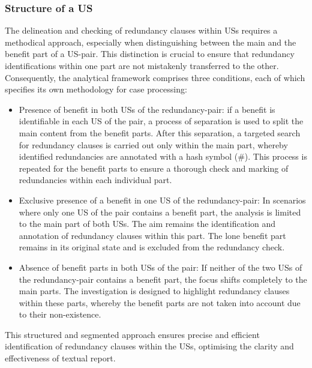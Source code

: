 \subsubsection*{Structure of a US}
The delineation and checking of redundancy clauses within USs requires a methodical approach, especially when distinguishing between the main and the benefit part of a US-pair. This distinction is crucial to ensure that redundancy identifications within one part are not mistakenly transferred to the other. Consequently, the analytical framework comprises three conditions, each of which specifies its own methodology for case processing:
\begin{itemize}
	\item Presence of benefit in both USs of the redundancy-pair: if a benefit is identifiable in each US of the pair, a process of separation is used to split the main content from the benefit parts. After this separation, a targeted search for redundancy clauses is carried out only within the main part, whereby identified redundancies are annotated with a hash symbol (\#). This process is repeated for the benefit parts to ensure a thorough check and marking of redundancies within each individual part.
	
	\item Exclusive presence of a benefit in one US of the redundancy-pair: In scenarios where only one US of the pair contains a benefit part, the analysis is limited to the main part of both USs. The aim remains the identification and annotation of redundancy clauses within this part. The lone benefit part remains in its original state and is excluded from the redundancy check.
	
	\item Absence of benefit parts in both USs of the pair: If neither of the two USs of the redundancy-pair contains a benefit part, the focus shifts completely to the main parts. The investigation is designed to highlight redundancy clauses within these parts, whereby the benefit parts are not taken into account due to their non-existence.
	
\end{itemize}
This structured and segmented approach ensures precise and efficient identification of redundancy clauses within the USs, optimising the clarity and effectiveness of textual report.
